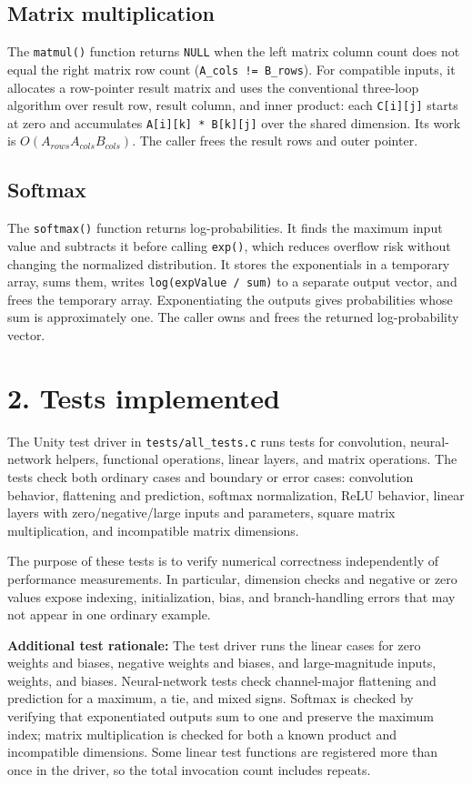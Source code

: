 \documentclass[10pt]{article}
\begin{document}
\subsection*{Matrix multiplication}
The \texttt{matmul()} function returns \texttt{NULL} when the left matrix column count does not equal the right matrix row count (\texttt{A\_cols != B\_rows}). For compatible inputs, it allocates a row-pointer result matrix and uses the conventional three-loop algorithm over result row, result column, and inner product: each \texttt{C[i][j]} starts at zero and accumulates \texttt{A[i][k] * B[k][j]} over the shared dimension. Its work is $O(A_{rows}A_{cols}B_{cols})$. The caller frees the result rows and outer pointer.

\subsection*{Softmax}
The \texttt{softmax()} function returns log-probabilities. It finds the maximum input value and subtracts it before calling \texttt{exp()}, which reduces overflow risk without changing the normalized distribution. It stores the exponentials in a temporary array, sums them, writes \texttt{log(expValue / sum)} to a separate output vector, and frees the temporary array. Exponentiating the outputs gives probabilities whose sum is approximately one. The caller owns and frees the returned log-probability vector.

\section*{2. Tests implemented}
The Unity test driver in \texttt{tests/all\_tests.c} runs tests for convolution, neural-network helpers, functional operations, linear layers, and matrix operations. The tests check both ordinary cases and boundary or error cases: convolution behavior, flattening and prediction, softmax normalization, ReLU behavior, linear layers with zero/negative/large inputs and parameters, square matrix multiplication, and incompatible matrix dimensions.

The purpose of these tests is to verify numerical correctness independently of performance measurements. In particular, dimension checks and negative or zero values expose indexing, initialization, bias, and branch-handling errors that may not appear in one ordinary example.

\textbf{Additional test rationale:} The test driver runs the linear cases for zero weights and biases, negative weights and biases, and large-magnitude inputs, weights, and biases. Neural-network tests check channel-major flattening and prediction for a maximum, a tie, and mixed signs. Softmax is checked by verifying that exponentiated outputs sum to one and preserve the maximum index; matrix multiplication is checked for both a known product and incompatible dimensions. Some linear test functions are registered more than once in the driver, so the total invocation count includes repeats.
\end{document}
